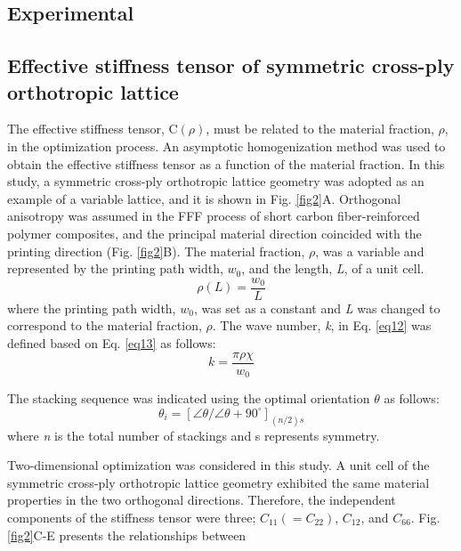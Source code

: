 \documentclass[a4paper,7pt,fleqn]{article}   %
\begin{document}
\begin{multicols}{2}
		\section{Experimental}
		\label{Experimental}
		
		\subsection{Effective stiffness tensor of symmetric cross-ply orthotropic lattice}
		The effective stiffness tensor, $\mathrm{C}(\rho)$, must be related to the material
		fraction, $\rho$, in the optimization process. An asymptotic homogenization
		method was used to obtain the effective stiffness tensor as a function of
		the material fraction. In this study, a symmetric cross-ply orthotropic
		lattice geometry was adopted as an example of a variable lattice, and it is
		shown in Fig. \ref{fig2}A. Orthogonal anisotropy was assumed in the FFF process
		of short carbon fiber-reinforced polymer composites, and the principal
		material direction coincided with the printing direction (Fig. \ref{fig2}B). The
		material fraction, $\rho$, was a variable and represented by the printing path
		width, $w_{0}$, and the length, \emph{L}, of a unit cell.
		\begin{equation}
			\rho(L)=\frac{w_{0}}{L}
			\label{eq13}
		\end{equation}
		where the printing path width, $w_{0}$, was set as a constant and \emph{L} was
		changed to correspond to the material fraction, $\rho$. The wave number, \emph{k},
		in Eq. \eqref{eq12} was defined based on Eq. \eqref{eq13} as follows:
		\begin{equation}
			k=\frac{\pi \rho \chi}{w_{0}} 
			\label{eq14}
		\end{equation}   \par   %
		The stacking sequence was indicated using the optimal orientation $\theta$ as follows:
		\begin{equation}
			\theta_{i}=[\angle \theta /\angle \theta +90^{\circ}]_{(n/2)s}
			\label{eq15}
		\end{equation}
		where \emph{n} is the total number of stackings and s represents symmetry. \par   %
		Two-dimensional optimization was considered in this study. A unit
		cell of the symmetric cross-ply orthotropic lattice geometry exhibited
		the same material properties in the two orthogonal directions. Therefore,
		the independent components of the stiffness tensor were three;
		$C_{11}(=C_{22})$, $C_{12}$, and $C_{66}$. Fig. \ref{fig2}C-E presents the relationships between

\end{multicols}
\end{document}
